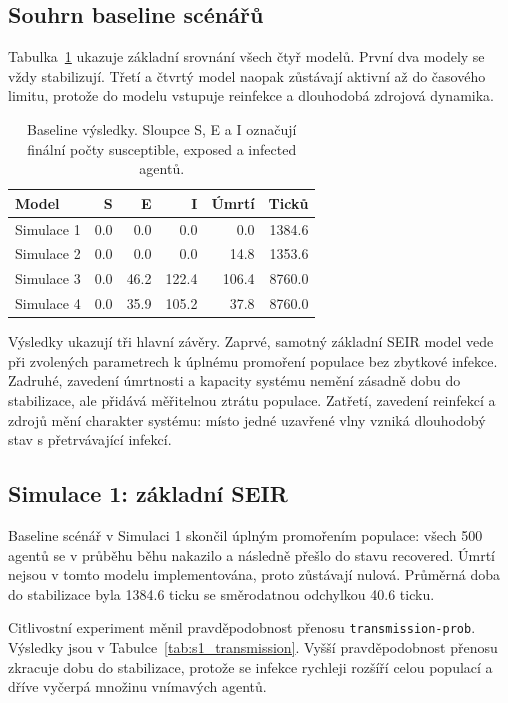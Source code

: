\documentclass{article}
\begin{document}
\subsection{Souhrn baseline scénářů}

Tabulka~\ref{tab:baseline_summary} ukazuje základní srovnání všech čtyř
modelů. První dva modely se vždy stabilizují. Třetí a čtvrtý model naopak
zůstávají aktivní až do časového limitu, protože do modelu vstupuje reinfekce
a dlouhodobá zdrojová dynamika.

\begin{table}[htbp]
\centering
\small
\begin{tabular}{l r r r r r}
\hline
\textbf{Model} & \textbf{S} & \textbf{E} & \textbf{I} & \textbf{Úmrtí} & \textbf{Ticků} \\
\hline
Simulace 1 & 0.0 & 0.0 & 0.0 & 0.0 & 1384.6 \\
Simulace 2 & 0.0 & 0.0 & 0.0 & 14.8 & 1353.6 \\
Simulace 3 & 0.0 & 46.2 & 122.4 & 106.4 & 8760.0 \\
Simulace 4 & 0.0 & 35.9 & 105.2 & 37.8 & 8760.0 \\
\hline
\end{tabular}
\caption{Baseline výsledky. Sloupce S, E a I označují finální počty
susceptible, exposed a infected agentů.}
\label{tab:baseline_summary}
\end{table}

Výsledky ukazují tři hlavní závěry. Zaprvé, samotný základní SEIR model vede
při zvolených parametrech k úplnému promoření populace bez zbytkové infekce.
Zadruhé, zavedení úmrtnosti a kapacity systému nemění zásadně dobu do
stabilizace, ale přidává měřitelnou ztrátu populace. Zatřetí, zavedení
reinfekcí a zdrojů mění charakter systému: místo jedné uzavřené vlny vzniká
dlouhodobý stav s přetrvávající infekcí.

\subsection{Simulace 1: základní SEIR}

Baseline scénář v Simulaci 1 skončil úplným promořením populace: všech 500
agentů se v průběhu běhu nakazilo a následně přešlo do stavu recovered. Úmrtí
nejsou v tomto modelu implementována, proto zůstávají nulová. Průměrná doba do
stabilizace byla 1384.6 ticku se směrodatnou odchylkou 40.6 ticku.

Citlivostní experiment měnil pravděpodobnost přenosu
\texttt{transmission-prob}. Výsledky jsou v Tabulce~\ref{tab:s1_transmission}.
Vyšší pravděpodobnost přenosu zkracuje dobu do stabilizace, protože se infekce
rychleji rozšíří celou populací a dříve vyčerpá množinu vnímavých agentů.
\end{document}
